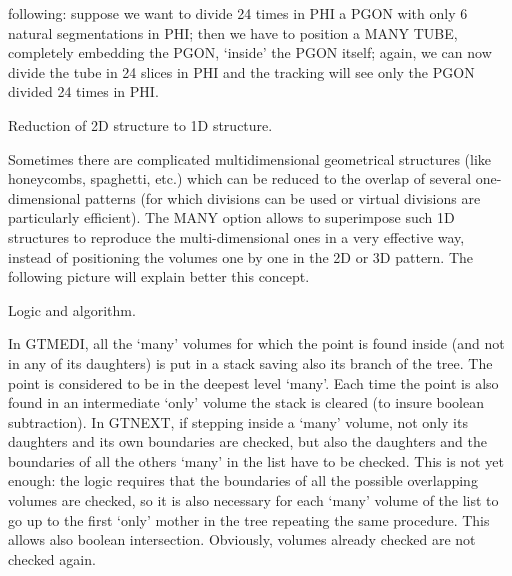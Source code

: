 following: suppose we want to divide 24 times in PHI a PGON with only 6 natural
segmentations in PHI; then we have to position a MANY TUBE, completely embedding
the PGON, `inside' the PGON itself; again, we can now divide the tube in 24
slices in PHI and the tracking will see only the PGON divided 24 times in PHI.
\begin{center}
Reduction of 2D structure to 1D structure.
\end{center}
Sometimes there are complicated multidimensional geometrical structures (like
honeycombs, spaghetti, etc.) which can be reduced to the overlap of several
one-dimensional patterns (for which divisions can be used or virtual divisions
are particularly efficient). The MANY option allows to superimpose such 1D
structures to reproduce the multi-dimensional ones in a very effective way,
instead of positioning the volumes one by one in the 2D or 3D pattern.
The following picture will explain better this concept.

\begin{center}
Logic and algorithm.\\[.5cm]
\end{center}
In GTMEDI, all the `many' volumes for which the point is found inside (and not
in any of its daughters) is put in a stack saving also its branch of the tree.
The point is considered to be in the deepest level `many'. Each time the point
is also found in an intermediate `only' volume the stack is cleared (to insure
boolean subtraction). In GTNEXT, if stepping inside a `many' volume, not only
its daughters and its own boundaries are checked, but also the daughters and
the boundaries of all the others `many' in the list have to be checked. This
is not yet enough: the logic requires that the boundaries of all the possible
overlapping volumes are checked, so it is also necessary for each `many' volume 
of the list to go up to the first `only' mother in the tree repeating the same 
procedure. This allows also boolean intersection. Obviously, volumes already
checked are not checked again. 








